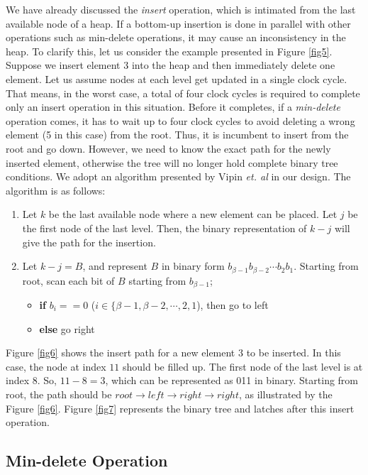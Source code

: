 \documentclass[10pt, conference, compsocconf]{IEEEtran}
\begin{document}
We have already discussed the {\it insert} operation, which is intimated from the last available node of a heap.
If a bottom-up insertion is done in parallel with other operations such as min-delete operations, it may cause an inconsistency in the heap.
To clarify this, let us consider the example presented in Figure \ref{fig5}.
Suppose we insert element $3$ into the heap and then immediately delete one element.
Let us assume nodes at each level get updated in a single clock cycle.
That means, in the worst case, a total of four clock cycles is required to complete only an insert operation in this situation.
Before it completes, if a {\it min-delete} operation comes, it has to wait up to four clock cycles to avoid deleting a wrong element (5 in this case) from the root.
Thus, it is incumbent to insert from the root and go down.
However, we need to know the exact path for the newly inserted element, otherwise the tree will no longer hold complete binary tree conditions.
We adopt an algorithm presented by Vipin {\it et. al} \cite{pq6} in our design. The algorithm is as follows:

\begin{enumerate}
\item Let $k$ be the last available node where a new element can be placed. Let $j$ be the first node of the last level. Then, the binary representation of $k-j$ will give the path for the insertion.
\item Let $k-j = B$, and represent $B$ in binary form $b_{\beta-1}b_{\beta-2} \cdots b_2b_1$. Starting from root, scan each bit of $B$ starting from $b_{\beta-1}$;
    \begin{itemize}
    \item {\bf if} $b_i == 0$ ($i \in \{\beta-1,\beta-2, \cdots, 2,1$), then go to left
    \item {\bf else} go right
    \end{itemize}
\end{enumerate}

Figure \ref{fig6} shows the insert path for a new element $3$ to be inserted. In this case, the node at index $11$ should be filled up.
The first node of the last level is at index $8$.
So, $11 - 8 = 3$, which can be represented as 011 in binary.
Starting from root, the path should be $root \rightarrow left \rightarrow right \rightarrow right$, as illustrated by the Figure \ref{fig6}. Figure \ref{fig7} represents the binary tree and latches after this insert operation.

\subsection{Min-delete Operation}
\end{document}
